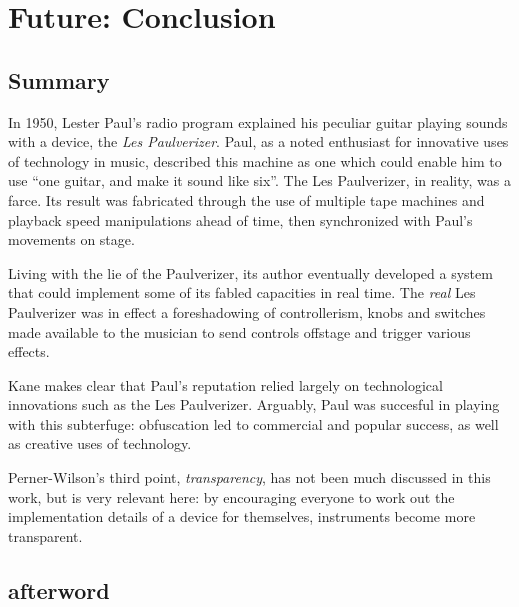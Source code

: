\chapter{Future: Conclusion}\label{conclusion}
 
\section{Summary}

In 1950, Lester Paul's radio program explained his peculiar guitar playing sounds with a device, the \emph{Les Paulverizer}. Paul, as a noted enthusiast for innovative uses of technology in music, described this machine as one which could enable him to use ``one guitar, and make it sound like six''. The Les Paulverizer, in reality, was a farce. Its result was fabricated through the use of multiple tape machines and playback speed manipulations ahead of time, then synchronized with Paul's movements on stage. 

Living with the lie of the Paulverizer, its author eventually developed a system that could implement some of its fabled capacities in real time. The \emph{real} Les Paulverizer was in effect a foreshadowing of controllerism, knobs and switches made available to the musician to send controls offstage and trigger various effects\citep{kane2014}. 

Kane makes clear that Paul's reputation relied largely on technological innovations such as the Les Paulverizer. Arguably, Paul was succesful in playing with this subterfuge: obfuscation led to commercial and popular success, as well as creative uses of technology. 

Perner-Wilson's third point, \emph{transparency}, has not been much discussed in this work, but is very relevant here: by encouraging everyone to work out the implementation details of a device for themselves, instruments become more transparent.  


\section{afterword}


